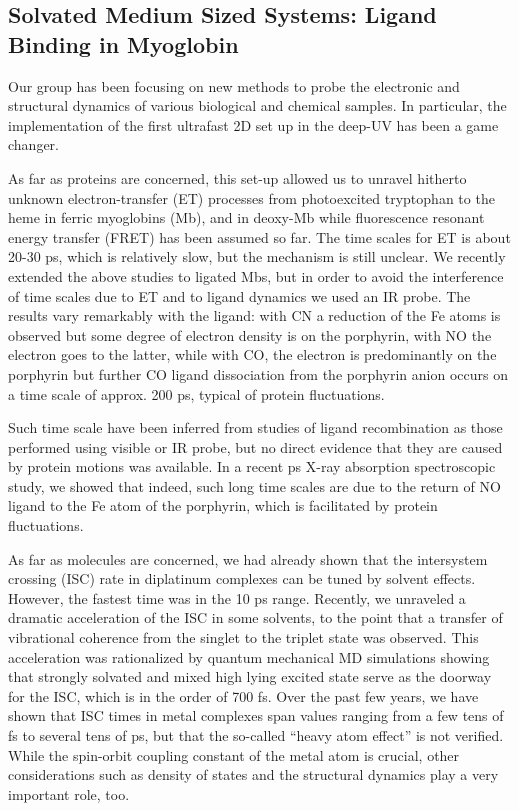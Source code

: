 \documentclass[journal=jacsat,manuscript=article]{achemso}
\begin{document}
\subsection{Solvated Medium Sized Systems: Ligand Binding in Myoglobin}
Our group has been focusing on new methods to probe the electronic and
structural dynamics of various biological and chemical samples. In
particular, the implementation of the first ultrafast 2D set up in the
deep-UV has been a game changer.\cite{aubock:2012,aubock2:2012}

As far as proteins are concerned, this set-up allowed us to unravel
hitherto unknown electron-transfer (ET) processes from photoexcited
tryptophan to the heme in ferric myoglobins (Mb),\cite{consani:2013}
and in deoxy-Mb\cite{monni:2015} while fluorescence resonant energy
transfer (FRET) has been assumed so far. The time scales for ET is
about 20-30 ps, which is relatively slow, but the mechanism is still
unclear. We recently extended the above studies to ligated Mbs, but in
order to avoid the interference of time scales due to ET and to ligand
dynamics we used an IR probe. The results vary remarkably with the
ligand: with CN a reduction of the Fe atoms is observed but some
degree of electron density is on the porphyrin, with NO the electron
goes to the latter, while with CO, the electron is predominantly on
the porphyrin but further CO ligand dissociation from the porphyrin
anion occurs on a time scale of approx. 200 ps, typical of protein
fluctuations.\cite{monni:prep}

Such time scale have been inferred from studies of ligand
recombination as those performed using visible or IR probe, but no
direct evidence that they are caused by protein motions was
available. In a recent ps X-ray absorption spectroscopic study, we
showed that indeed, such long time scales are due to the return of NO
ligand to the Fe atom of the porphyrin,\cite{silatani:2015} which is
facilitated by protein fluctuations.

As far as molecules are concerned, we had already shown that the
intersystem crossing (ISC) rate in diplatinum complexes can be tuned
by solvent effects.\cite{chergui.jacs.2011} However, the fastest time
was in the 10 ps range. Recently, we unraveled a dramatic acceleration
of the ISC in some solvents, to the point that a transfer of
vibrational coherence from the singlet to the triplet state was
observed.\cite{monni:2017,monni:rev} This acceleration was
rationalized by quantum mechanical MD simulations showing that
strongly solvated and mixed high lying excited state serve as the
doorway for the ISC, which is in the order of 700 fs. Over the past
few years, we have shown that ISC times in metal complexes span values
ranging from a few tens of fs to several tens of ps, but that the
so-called “heavy atom effect” is not verified. While the spin-orbit
coupling constant of the metal atom is crucial, other considerations
such as density of states and the structural dynamics play a very
important role, too.\cite{chergui:2012,chergui:2015}
\end{document}
